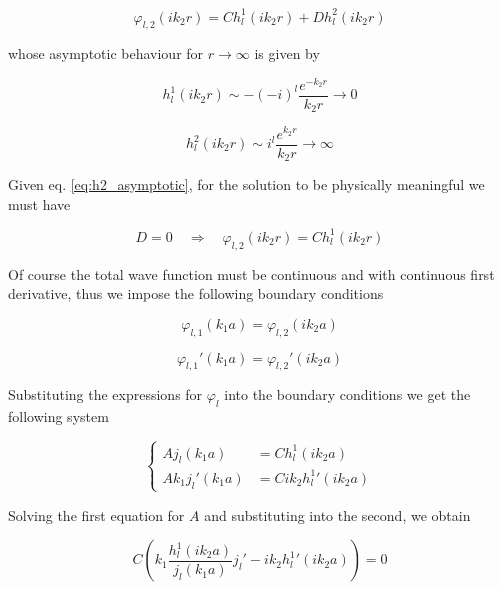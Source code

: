 \documentclass{article}
\begin{document}
\begin{equation}
\varphi_{l,2}(ik_2r) = C h_l^1(ik_2r) + D h_l^2(ik_2r)
\end{equation} 

whose asymptotic behaviour for \( r \rightarrow \infty \) is given by

\begin{equation}
h_l^1(ik_2r) \sim -(-i)^l \frac{e^{-k_2r}}{k_2r} \rightarrow 0
\end{equation}

\begin{equation}
\label{eq:h2_asymptotic}
h_l^2(ik_2r) \sim i^l \frac{e^{k_2r}}{k_2r} \rightarrow \infty
\end{equation}

Given eq. \eqref{eq:h2_asymptotic}, for the solution to be physically meaningful we must have

\begin{equation}
D = 0 \quad \Rightarrow \quad \varphi_{l,2}(ik_2r) = C h_l^1(ik_2r)
\end{equation}

Of course the total wave function must be continuous and with continuous first derivative, thus we impose the following boundary conditions

\begin{equation}
\varphi_{l,1}(k_1a) = \varphi_{l,2}(ik_2a)
\end{equation}

\begin{equation}
\varphi_{l,1}'(k_1a) = \varphi_{l,2}'(ik_2a)
\end{equation}

Substituting the expressions for \( \varphi_l \) into the boundary conditions we get the following system

\begin{equation}
  \begin{cases}
    A j_l(k_1a) & = C h_l^1(ik_2a) \\
    A k_1 j_l'(k_1a) & = C i k_2 {h_l^1}'(ik_2a)
  \end{cases}
\end{equation}

Solving the first equation for \( A \) and substituting into the second, we obtain

\begin{equation}
C \left( k_1 \frac{h_l^1(ik_2a)}{j_l(k_1a)} j_l' - i k_2 {h_l^1}'(ik_2a) \right) = 0
\end{equation}
\end{document}
